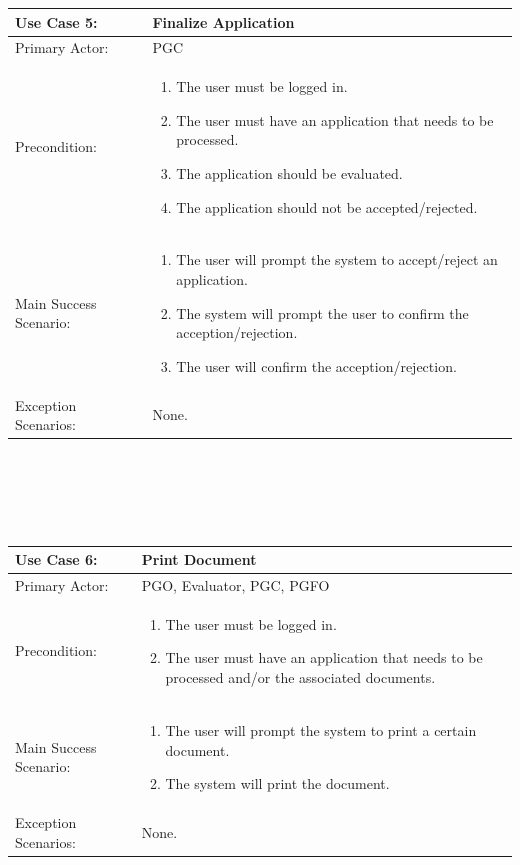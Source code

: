 \documentclass{article}
\begin{document}
\begin{tabular} {| m{5cm} | m{10cm} |}
\hline
Use Case 5: & Finalize Application \\
\hline
Primary Actor: & PGC \\
\hline
Precondition: & \begin{enumerate} \itemsep0em \item The user must be logged in. 
\item The user must have an application that needs to be processed.
\item The application should be evaluated.
\item The application should not be accepted/rejected.
\end{enumerate} \\
\hline
Main Success Scenario: & \begin{enumerate} \itemsep0em \item The user will prompt the system to accept/reject an application.
\item The system will prompt the user to confirm the acception/rejection.
\item The user will confirm the acception/rejection.
\end{enumerate}\\
\hline
Exception Scenarios: & None.\\
\hline
\end{tabular}
\\ \\ \\ \\
\begin{tabular} {| m{5cm} | m{10cm} |}
\hline
Use Case 6: & Print Document \\
\hline
Primary Actor: & PGO, Evaluator, PGC, PGFO \\
\hline
Precondition: & \begin{enumerate} \itemsep0em \item The user must be logged in. 
\item The user must have an application that needs to be processed and/or the associated documents.
\end{enumerate} \\
\hline
Main Success Scenario: & \begin{enumerate} \itemsep0em \item The user will prompt the system to print a certain document.
\item The system will print the document.
\end{enumerate}\\
\hline
Exception Scenarios: & None. \\
\hline
\end{tabular}
\end{document}
